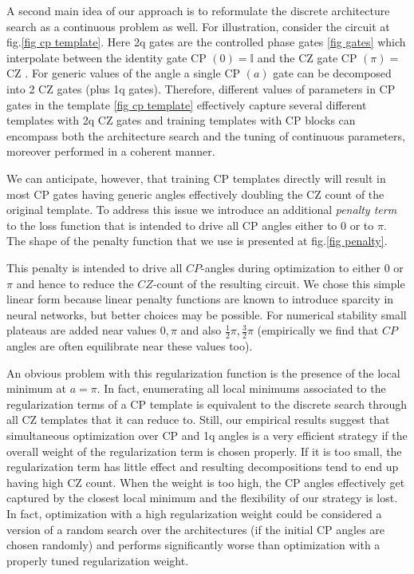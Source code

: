 \documentclass[twocolumn, amsfonts, amssymb, aps, nofootinbib]{revtex4-2}
\newcommand{\CZ}{CZ }
\newcommand{\CP}{CP }
\begin{document}
A second main idea of our approach is to reformulate the discrete architecture search as a continuous problem as well. For illustration, consider the circuit at fig.\ref{fig cp template}. Here 2q gates are the controlled phase gates \eqref{fig gates} which interpolate between the identity gate \CP$(0)=\mathbb{I}$ and the \CZ gate \CP$(\pi)=$\CZ. For generic values of the angle a single \CP$(a)$ gate can be decomposed into 2 \CZ gates (plus 1q gates). Therefore, different values of parameters in \CP gates in the template \eqref{fig cp template} effectively capture several different templates with 2q \CZ gates and training templates with \CP blocks can encompass both the architecture search and the tuning of continuous parameters, moreover performed in a coherent manner.

We can anticipate, however, that training \CP templates directly will result in most \CP gates having generic angles effectively doubling the \CZ count of the original template. To address this issue we introduce an additional \textit{penalty term} to the loss function that is intended to drive all \CP angles either to $0$ or to $\pi$. The shape of the penalty function that we use is presented at fig.\ref{fig penalty}.

This penalty is intended to drive all $CP$-angles during optimization to either $0$ or $\pi$ and hence to reduce the $CZ$-count of the resulting circuit. We chose this simple linear form because linear penalty functions are known to introduce sparcity \cite{} in neural networks, but better choices may be possible. For numerical stability small plateaus are added near values $0,\pi$ and also $\frac12\pi, \frac32\pi$  (empirically we find that $CP$ angles are often equilibrate near these values too).

An obvious problem with this regularization function is the presence of the local minimum at $a=\pi$. In fact, enumerating all local minimums associated to the regularization terms of a \CP template is equivalent to the discrete search through all \CZ templates that it can reduce to. Still, our empirical results suggest that simultaneous optimization over \CP and 1q angles is a very efficient strategy if the overall weight of the regularization term is chosen properly. If it is too small, the regularization term has little effect and resulting decompositions tend to end up having high \CZ count. When the weight is too high, the \CP angles effectively get captured by the closest local minimum and the flexibility of our strategy is lost. In fact, optimization with a high regularization weight could be considered a version of a random search over the architectures (if the initial \CP angles are chosen randomly) and performs significantly worse than optimization with a properly tuned regularization weight.
\end{document}
